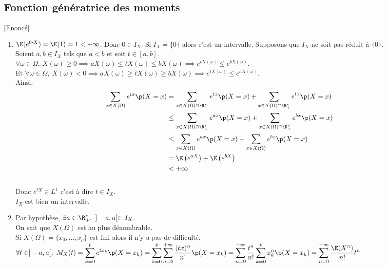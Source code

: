 \documentclass[8pt]{book}
\begin{document}
	\subsection{Fonction génératrice des moments }
	\label{Fonction génératrice des moments corrigé}
	\textcolor{blue}{\hyperref[Fonction génératrice des moments]{[Enoncé]}}\\
	\begin{enumerate}[leftmargin=*]
		\item $\E(e^{0\cdot X})=\E(1)=1<+\infty$. Donc $0\in I_X$. Si $I_X=\{0\}$ alors c'est un intervalle. Supposons que $I_X$ ne soit pas réduit à $\{0\}$.\\
		Soient $a,b\in I_X$ tels que $a<b$ et soit $t\in [a,b]$.\\
		$\forall \omega\in \Omega,\ X(\omega)\geq 0\implies aX(\omega)\leq tX(\omega)\leq bX(\omega)\implies e^{tX(\omega)}\leq e^{bX(\omega)}$.\\
		Et $\forall \omega\in \Omega,\ X(\omega)<0\implies aX(\omega)\geq tX(\omega)\geq bX(\omega)\implies e^{tX(\omega)}\leq e^{aX(\omega)}$.\\
		Ainsi, \begin{align*}
			\sum\limits_{x\in X(\Omega)}e^{tx}\p(X=x)&=\sum\limits_{x\in X(\Omega)\cap\R^*_-}e^{tx}\p(X=x)+\sum\limits_{x\in X(\Omega)\cap\R^*_+}e^{tx}\p(X=x)\\
			&\leq \sum\limits_{x\in X(\Omega)\cap\R^*_-}e^{ax}\p(X=x)+\sum\limits_{x\in X(\Omega)\cap\R^*_+}e^{bx}\p(X=x)\\
			&\leq \sum\limits_{x\in X(\Omega)}e^{ax}\p(X=x)+\sum\limits_{x\in X(\Omega)}e^{bx}\p(X=x)\\
			&=\E\left(e^{aX}\right)+\E\left(e^{bX}\right)\\
			&<+\infty
		\end{align*}\\
		Donc $e^{tX}\in L^1$ c'est à dire $t\in I_X$.\\
		$I_X$ est bien un intervalle.
		\item Par hypothèse, $\exists a\in \R^*_+,\ ]-a,a[\subset I_X$.\\
		On sait que $X(\Omega)$ est au plus dénombrable.\\
		Si $X(\Omega)=\{x_0,\dots,x_p\}$ est fini alors il n'y a pas de difficulté,\\
		$\forall t\in ]-a,a[,\ M_X(t)=\displaystyle\sum\limits_{k=0}^pe^{tx_k}\p(X=x_k)=\sum\limits_{k=0}^p\sum\limits_{n=0}^{+\infty}\frac{(tx)^n}{n!}\p(X=x_k)=\sum\limits_{n=0}^{+\infty}\frac{t^n}{n!}\sum\limits_{k=0}^px_k^n\p(X=x_k)=\sum\limits_{n=0}^{+\infty}\frac{\E(X^n)}{n!}t^n$\\

\end{enumerate}
\end{document}
